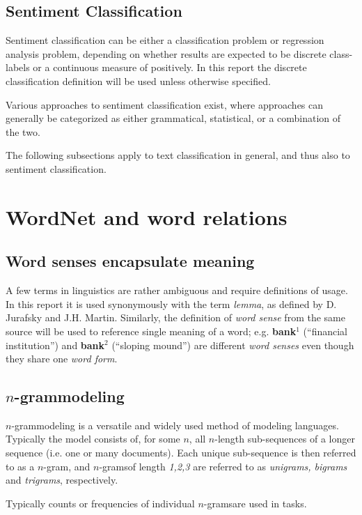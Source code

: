 \documentclass[a4paper,11pt]{kth-mag}
\newcommand{\ngram}{$n$-gram\ignorespaces}
\newcommand{\ngrams}{$n$-grams\ignorespaces}
\begin{document}
\subsection{Sentiment Classification}
Sentiment classification can be either a classification problem or regression analysis problem\cite{liu2012sentiment}, depending on whether results are expected to be discrete class-labels or a continuous measure of positively. In this report the discrete classification definition will be used unless otherwise specified.

Various approaches to sentiment classification exist, where approaches can generally be categorized as either grammatical\cite{todo}, statistical\cite{todo}, or a combination of the two.

The following subsections apply to text classification in general, and thus also to sentiment classification.

\section{WordNet and word relations}
\subsection{Word senses encapsulate meaning}
A few terms in linguistics are rather ambiguous and require definitions of usage. In this report it is used synonymously with the term \emph{lemma}, as defined by D. Jurafsky and J.H. Martin\cite{nlpbook}. Similarly, the definition of \emph{word sense} from the same source will be used to reference single meaning of a word; e.g. \textbf{bank$^1$} (``financial institution'') and \textbf{bank$^2$} (``sloping mound'') are different \emph{word senses} even though they share one \emph{word form}.

\subsection{\ngram modeling}
\ngram modeling is a versatile and widely used method of modeling languages. Typically the model consists of, for some $n$, all $n$-length sub-sequences of a longer sequence (i.e. one or many documents). Each unique sub-sequence is then referred to as a \ngram, and \ngrams of length \emph{1,2,3} are referred to as \emph{unigrams, bigrams} and \emph{trigrams}, respectively\cite{ngram}.

Typically counts or frequencies of individual \ngrams are used in tasks.
\end{document}
